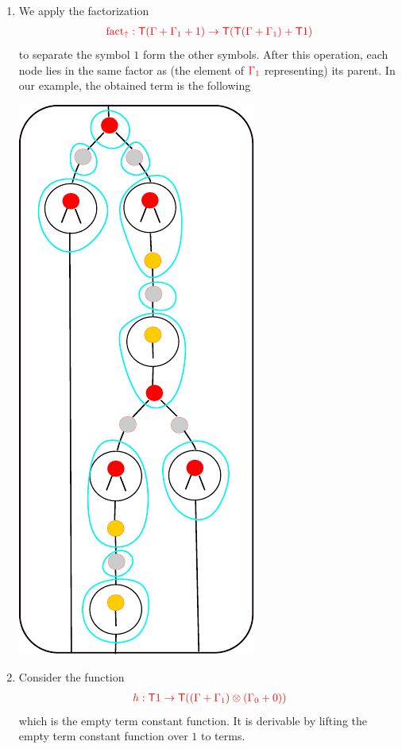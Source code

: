 \begin{example}
\begin{enumerate}
\begin{center}
		\end{center}
\item We apply the factorization 
\begin{align*}
{\color{red}{{\color{red}{\mathrm{fact_{\uparrow}}}}: {\color{red}{\mathsf T}}(\Gamma+\Gamma_1+1) \to {\color{red}{\mathsf T}}({\color{red}{\mathsf T}}(\Gamma+\Gamma_1)+{\color{red}{\mathsf T}}1)}}
\end{align*}
 to separate the symbol $1$ form the other symbols. After this operation, each node lies in the same factor as (the element of ${\color{red}{\Gamma_1}}$ representing) its parent. In our example, the obtained term is the following
\begin{center}
		\includegraphics[scale=.5]{parent-5.pdf}
		\end{center}
\item Consider the function 
\begin{align*}
{\color{red}{h: {\color{red}{\mathsf T}}1 \to {\color{red}{\mathsf T}}((\Gamma+\Gamma_1)\otimes(\Gamma_0+0))}}
\end{align*}
which is the empty term constant function. It is derivable by lifting the empty term constant function over $1$ to terms.

\end{enumerate}
\end{example}
